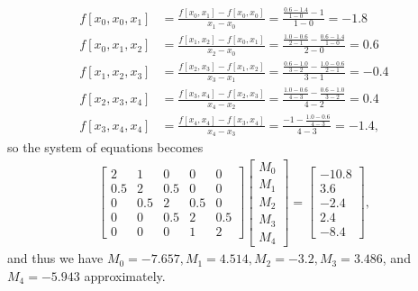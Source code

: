 \documentclass[a4paper,12pt]{article}
\begin{document}
\begin{enumerate}
\begin{align*}
            f[x_0, x_0, x_1] &= \frac{f[x_0, x_1] - f[x_0, x_0]}{x_1 - x_0} = \frac{\frac{0.6 - 1.4}{1 - 0} - 1}{1 - 0} = -1.8 \\
            f[x_0, x_1, x_2] &= \frac{f[x_1, x_2] - f[x_0, x_1]}{x_2 - x_0} = \frac{\frac{1.0 - 0.6}{2 - 1} - \frac{0.6 - 1.4}{1 - 0}}{2 - 0} = 0.6 \\
            f[x_1, x_2, x_3] &= \frac{f[x_2, x_3] - f[x_1, x_2]}{x_3 - x_1} = \frac{\frac{0.6 - 1.0}{3 - 2} - \frac{1.0 - 0.6}{2 - 1}}{3 - 1} = -0.4 \\
            f[x_2, x_3, x_4] &= \frac{f[x_3, x_4] - f[x_2, x_3]}{x_4 - x_2} = \frac{\frac{1.0 - 0.6}{4 - 3} - \frac{0.6 - 1.0}{3 - 2}}{4 - 2} = 0.4 \\
            f[x_3, x_4, x_4] &= \frac{f[x_4, x_4] - f[x_3, x_4]}{x_4 - x_3} = \frac{-1 - \frac{1.0 - 0.6}{4 - 3}}{4 - 3} = -1.4,
        \end{align*}
        so the system of equations becomes
        \begin{align*}
            \left[ \begin{array}{ccccc}
                    2 & 1 & 0 & 0 & 0 \\
                    0.5 & 2 & 0.5 & 0 & 0 \\
                    0 & 0.5 & 2 & 0.5 & 0 \\
                    0 & 0 & 0.5 & 2 & 0.5 \\
                    0 & 0 & 0 & 1 & 2
            \end{array} \right]
            \left[ \begin{array}{c}
                    M_0 \\
                    M_1 \\
                    M_2 \\
                    M_3 \\
                    M_4
            \end{array} \right]
            =
            \left[ \begin{array}{c}
                    -10.8 \\
                    3.6 \\
                    -2.4 \\
                    2.4 \\
                   -8.4 
            \end{array} \right],
        \end{align*}
        and thus we have $M_0 = -7.657, M_1 = 4.514, M_2 = -3.2, M_3 = 3.486$, and $M_4 = -5.943$ approximately. \par

\end{enumerate}
\end{document}
